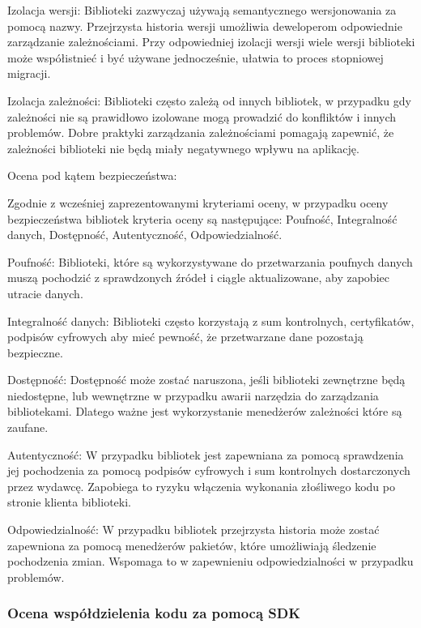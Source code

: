 \documentclass[runningheads,12pt]{llncs}
\begin{document}
Izolacja wersji: Biblioteki zazwyczaj używają semantycznego wersjonowania za pomocą nazwy. Przejrzysta historia wersji umożliwia deweloperom odpowiednie zarządzanie zależnościami. Przy odpowiedniej izolacji wersji wiele wersji biblioteki może współistnieć i być używane jednocześnie, ułatwia to proces stopniowej migracji. ~\cite[p. 172]{fowler2012patterns}

Izolacja zależności: Biblioteki często zależą od innych bibliotek, w przypadku gdy zależności nie są prawidłowo izolowane mogą prowadzić do konfliktów i innych problemów. Dobre praktyki zarządzania zależnościami pomagają zapewnić, że zależności biblioteki nie będą miały negatywnego wpływu na aplikację. ~\cite[p. 218]{martin2008clean}

Ocena pod kątem bezpieczeństwa:

Zgodnie z wcześniej zaprezentowanymi kryteriami oceny, w przypadku oceny bezpieczeństwa bibliotek kryteria oceny są następujące: Poufność, Integralność danych, Dostępność, Autentyczność, Odpowiedzialność.

Poufność: Biblioteki, które są wykorzystywane do przetwarzania poufnych danych muszą pochodzić z sprawdzonych źródeł i ciągle aktualizowane, aby zapobiec utracie danych. ~\cite[p. 82]{Essential}

Integralność danych: Biblioteki często korzystają z sum kontrolnych, certyfikatów, podpisów cyfrowych aby mieć pewność, że przetwarzane dane pozostają bezpieczne. ~\cite[p. 84]{Essential}

Dostępność: Dostępność może zostać naruszona, jeśli biblioteki zewnętrzne będą niedostępne, lub wewnętrzne w przypadku awarii narzędzia do zarządzania bibliotekami. Dlatego ważne jest wykorzystanie menedżerów zależności które są zaufane. ~\cite[p. 85]{Essential}

Autentyczność: W przypadku bibliotek jest zapewniana za pomocą sprawdzenia jej pochodzenia za pomocą podpisów cyfrowych i sum kontrolnych dostarczonych przez wydawcę. Zapobiega to ryzyku włączenia wykonania złośliwego kodu po stronie klienta biblioteki.  ~\cite[p. 87]{Essential}

Odpowiedzialność: W przypadku bibliotek przejrzysta historia może zostać zapewniona za pomocą menedżerów pakietów, które umożliwiają śledzenie pochodzenia zmian. Wspomaga to w zapewnieniu odpowiedzialności w przypadku problemów.  ~\cite[p. 88]{Essential}

\subsubsection{Ocena współdzielenia kodu za pomocą SDK}
\end{document}
